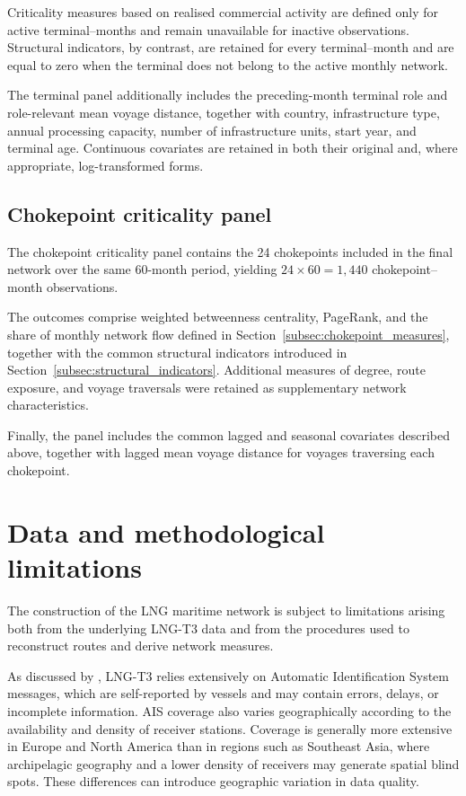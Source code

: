 \documentclass[pdftex,12pt,openright,a4paper,oneside]{book}
\begin{document}
Criticality measures based on realised commercial activity are defined only for active terminal--months and remain unavailable for inactive observations. Structural indicators, by contrast, are retained for every terminal--month and are equal to zero when the terminal does not belong to the active monthly network.

The terminal panel additionally includes the preceding-month terminal role and role-relevant mean voyage distance, together with country, infrastructure type, annual processing capacity, number of infrastructure units, start year, and terminal age.
Continuous covariates are retained in both their original and, where appropriate, log-transformed forms.

\subsection{Chokepoint criticality panel}
\label{subsec:chokepoint_panel}
The chokepoint criticality panel contains the 24 chokepoints included in the final network over the same 60-month period, yielding \(24 \times 60 = 1{,}440\) chokepoint--month observations.

The outcomes comprise weighted betweenness centrality, PageRank, and the share of monthly network flow defined in Section~\ref{subsec:chokepoint_measures}, together with the common structural indicators introduced in Section~\ref{subsec:structural_indicators}. 
Additional measures of degree, route exposure, and voyage traversals were retained as supplementary network characteristics.

Finally, the panel includes the common lagged and seasonal covariates described above, together with lagged mean voyage distance for voyages traversing each chokepoint.

\section{Data and methodological limitations}
\label{sec:data_limitations}

The construction of the LNG maritime network is subject to limitations arising
both from the underlying LNG-T3 data and from the procedures used to reconstruct
routes and derive network measures.

As discussed by \citet{zhou2026}, LNG-T3 relies extensively on Automatic
Identification System messages, which are self-reported by vessels and may
contain errors, delays, or incomplete information. AIS coverage also varies
geographically according to the availability and density of receiver stations.
Coverage is generally more extensive in Europe and North America than in
regions such as Southeast Asia, where archipelagic geography and a lower
density of receivers may generate spatial blind spots. These differences can
introduce geographic variation in data quality.
\end{document}
